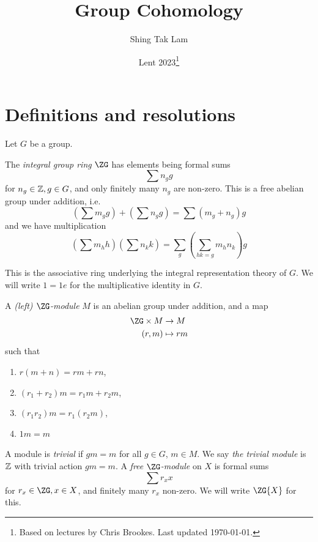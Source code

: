 \documentclass{article}
\title{Group Cohomology}
\author{Shing Tak Lam}
\date{Lent 2023\footnote{Based on lectures by Chris Brookes. Last updated \today.}}
\begin{document}
\maketitle

\tableofcontents

\lec

\section{Definitions and resolutions}

Let \(G\) be a group.

\begin{definition}
    The \emph{integral group ring} \(\ZG\) has elements being formal sums
    \[\sum n_g g\]
    for \(n_g \in \mathbb{Z}, g \in G\), and only finitely many \(n_g\) are non-zero. This is a free abelian group under addition, i.e.
    \[\left(\sum m_g g\right) + \left(\sum n_g g\right) = \sum (m_g + n_g) g\]
    and we have multiplication
    \[\left(\sum m_h h\right)\left(\sum n_k k\right) = \sum_g \left(\sum_{hk = g}m_hn_k\right) g\]
\end{definition}

This is the associative ring underlying the integral representation theory of \(G\). We will write \(1 = 1e\) for the multiplicative identity in \(G\).

\begin{definition}
    [module]
    A \emph{(left) \(\ZG\)-module} \(M\) is an abelian group under addition, and a map
    \begin{align*}
        \ZG \times M &\to M \\
        (r, m) &\mapsto rm
    \end{align*}
    such that
    \begin{enumerate}
        \item \(r(m + n) = rm + rn\),
        \item \((r_1 + r_2)m = r_1m + r_2 m\),
        \item \((r_1r_2)m = r_1(r_2m)\),
        \item \(1m = m\)
    \end{enumerate}
\end{definition}

A module is \emph{trivial} if \(gm = m\) for all \(g \in G\), \(m \in M\). We say \emph{the trivial module} is \(\mathbb{Z}\) with trivial action \(gm = m\). A \emph{free \(\ZG\)-module} on \(X\) is formal sums
\[\sum r_x x\]
for \(r_x \in \ZG, x \in X\), and finitely many \(r_x\) non-zero. We will write \(\ZG\{X\}\) for this.
\end{document}
